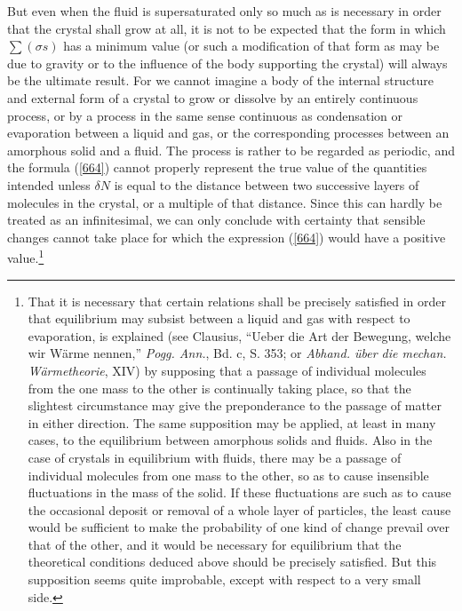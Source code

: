 \documentclass[12pt]{article}
\newcommand{\dd}{\delta}
\begin{document}
But even when the fluid is supersaturated only so much as is necessary in order that the crystal shall grow at all, it is not to be expected that the form in which $\sum(\sigma s)$ has a minimum value (or such a modification of that form as may be due to gravity or to the influence of the body supporting the crystal) will always be the ultimate result. For we cannot imagine a body of the internal structure and external form of a crystal to grow or dissolve by an entirely continuous process, or by a process in the same sense continuous as condensation or evaporation between a liquid and gas, or the corresponding processes between an amorphous solid and a fluid. The process is rather to be regarded as periodic, and the formula (\ref{664}) cannot properly represent the true value of the quantities intended unless $\dd N$ is equal to the distance between two successive layers of molecules in the crystal, or a multiple of that distance. Since this can hardly be treated as an infinitesimal, we can only conclude with certainty that sensible changes cannot take place for which the expression (\ref{664}) would have a positive value.\footnote{That it is necessary that certain relations shall be precisely satisfied in order that equilibrium may subsist between a liquid and gas with respect to evaporation, is explained (see Clausius, ``Ueber die Art der Bewegung, welche wir W\"{a}rme nennen,'' \textit{Pogg. Ann.}, Bd. c, S. 353; or \textit{Abhand. \"{u}ber die mechan. W\"{a}rmetheorie}, XIV) by supposing that a passage of individual molecules from the one mass to the other is continually taking place, so that the slightest circumstance may give the preponderance to the passage of matter in either direction.  The same supposition may be applied, at least in many cases, to the equilibrium between amorphous solids and fluids. Also in the case of crystals in equilibrium with fluids, there may be a passage of individual molecules from one mass to the other, so as to cause insensible fluctuations in the mass of the solid. If these fluctuations are such as to cause the occasional deposit or removal of a whole layer of particles, the least cause would be sufficient to make the probability of one kind of change prevail over that of the other, and it would be necessary for equilibrium that the theoretical conditions deduced above should be precisely satisfied. But this supposition seems quite improbable, except with respect to a very small side.\par
}
\end{document}
